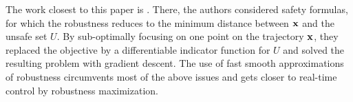 The work closest to this paper is \cite{AbbasATVA11_LinFalsification,Abbas14_MTLDescent}.
There, the authors considered safety formulas, for which the robustness reduces to the minimum distance between $\mathbf{x}$ and the unsafe set $U$.
By sub-optimally focusing on one point on the trajectory $\mathbf{x}$, they replaced the objective by a differentiable indicator function for $U$ and solved the resulting problem with gradient descent.
The use of fast smooth approximations of robustness circumvents most of the above issues and gets closer to real-time control by robustness maximization.




